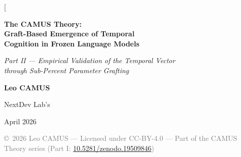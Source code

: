 \documentclass[10pt,twocolumn,letterpaper]{article}
\begin{document}
\twocolumn[
\begin{@twocolumnfalse}
\begin{center}
\vspace*{8mm}

{\LARGE\bfseries The CAMUS Theory:\\[4pt]
Graft-Based Emergence of Temporal\\[4pt]
Cognition in Frozen Language Models\par}

\vspace{6mm}

{\large\itshape Part II --- Empirical Validation of the Temporal Vector\\
through Sub-Percent Parameter Grafting\par}

\vspace{8mm}

{\large\bfseries Leo CAMUS\par}
\vspace{2mm}
{\normalsize NextDev Lab's\par}
\vspace{2mm}
{\small April 2026\par}

\vspace{2mm}
{\footnotesize\textcolor{gray}{\copyright~2026 Leo CAMUS --- Licensed under CC-BY-4.0 --- Part of the CAMUS Theory series (Part I: \href{https://doi.org/10.5281/zenodo.19509846}{10.5281/zenodo.19509846})}\par}

\vspace{6mm}

\begin{minipage}{0.92\textwidth}
\renewcommand{\abstractnamefont}{\normalfont\bfseries\large}
\renewcommand{\abstracttextfont}{\normalfont\small}
\begin{abstract}
This paper is the empirical sequel to the first CAMUS Theory manuscript~\cite{camus2026}, which proposed the five-component temporal vector $\mathbf{T}(t) = (\delta_{\text{prev}}, \delta_{\text{session}}, \tau_{\text{inf}}, \omega_{\text{context}}, \rho_{\text{rate}})$ as the missing cognitive primitive of current Large Language Models and formulated five falsifiable predictions (P1--P5). The original paper was deliberately theoretical: full pre-training of a temporally augmented model lay beyond the authors' compute budget.


\end{abstract}
\end{minipage}
\end{center}
\end{@twocolumnfalse}
\end{document}
